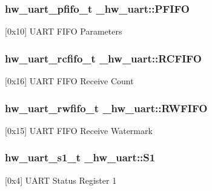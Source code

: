 \subsubsection[{\texorpdfstring{P\+F\+I\+FO}{PFIFO}}]{ {\bf hw\+\_\+uart\+\_\+pfifo\+\_\+t} \+\_\+hw\+\_\+uart\+::\+P\+F\+I\+FO}\hypertarget{struct__hw__uart_a0da32e3a24cd9a675925ebb26d129464}{}\label{struct__hw__uart_a0da32e3a24cd9a675925ebb26d129464}
\mbox{[}0x10\mbox{]} U\+A\+RT F\+I\+FO Parameters 
\subsubsection[{\texorpdfstring{R\+C\+F\+I\+FO}{RCFIFO}}]{ {\bf hw\+\_\+uart\+\_\+rcfifo\+\_\+t} \+\_\+hw\+\_\+uart\+::\+R\+C\+F\+I\+FO}\hypertarget{struct__hw__uart_a2ef162033ed382b50eb72cf65223a80a}{}\label{struct__hw__uart_a2ef162033ed382b50eb72cf65223a80a}
\mbox{[}0x16\mbox{]} U\+A\+RT F\+I\+FO Receive Count 
\subsubsection[{\texorpdfstring{R\+W\+F\+I\+FO}{RWFIFO}}]{ {\bf hw\+\_\+uart\+\_\+rwfifo\+\_\+t} \+\_\+hw\+\_\+uart\+::\+R\+W\+F\+I\+FO}\hypertarget{struct__hw__uart_af7ebef9301032b43e8fb9916574f7c31}{}\label{struct__hw__uart_af7ebef9301032b43e8fb9916574f7c31}
\mbox{[}0x15\mbox{]} U\+A\+RT F\+I\+FO Receive Watermark 
\subsubsection[{\texorpdfstring{S1}{S1}}]{ {\bf hw\+\_\+uart\+\_\+s1\+\_\+t} \+\_\+hw\+\_\+uart\+::\+S1}\hypertarget{struct__hw__uart_a30341939416e73c1f6ce7f17798af04b}{}\label{struct__hw__uart_a30341939416e73c1f6ce7f17798af04b}
\mbox{[}0x4\mbox{]} U\+A\+RT Status Register 1 
